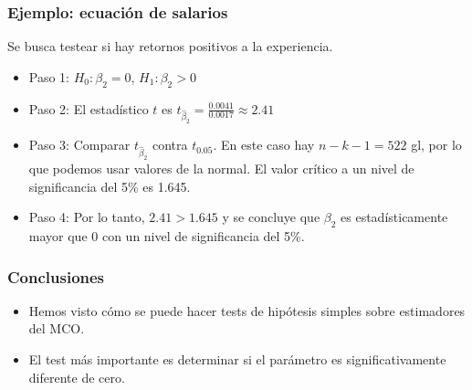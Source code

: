 \documentclass{beamer}
\begin{document}
\begin{frame}
\frametitle{Ejemplo: ecuación de salarios}
Se busca testear si hay retornos positivos a la experiencia.

\begin{itemize}
    \item Paso 1: $H_0: \beta_2 =0$, $H_1: \beta_2 > 0$
    \item Paso 2: El estadístico $t$ es $t_{\hat{\beta}_2} = \frac{0.0041}{0.0017} \approx 2.41$
    \item Paso 3: Comparar $t_{\hat{\beta}_2}$ contra $t_{0.05}$. En este caso hay $n - k - 1 = 522$ gl, por lo que podemos usar valores de  la normal. El valor crítico a un nivel de significancia del 5\% es 1.645.
    \item Paso 4: Por lo tanto, $2.41 > 1.645$ y se concluye que $\beta_2$ es estadísticamente mayor que 0 con un nivel de significancia del 5\%.
\end{itemize}
\end{frame}

\begin{frame}
\frametitle{Conclusiones}
\begin{itemize}
    \item Hemos visto cómo se puede hacer tests de hipótesis simples sobre estimadores del MCO.
    \item El test más importante es determinar si el parámetro es significativamente diferente de cero.
   
\end{itemize}
\end{frame}
\end{document}
